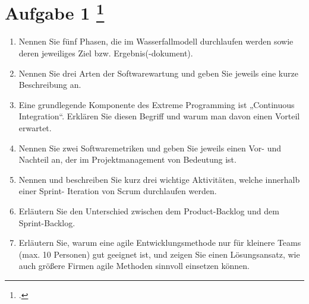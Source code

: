 \documentclass{lehramt-informatik-aufgabe}
\begin{document}
\liAufgabenTitel{}
\section{Aufgabe 1
\footcite{66116:2020:09}}

\begin{enumerate}

\item Nennen Sie fünf Phasen, die im Wasserfallmodell durchlaufen werden
sowie deren jeweiliges Ziel bzw. Ergebnis(-dokument).


\item Nennen Sie drei Arten der Softwarewartung und geben Sie jeweils
eine kurze Beschreibung an.


\item Eine grundlegende Komponente des Extreme Programming ist
„Continuous Integration“. Erklären Sie diesen Begriff und warum man
davon einen Vorteil erwartet.


\item Nennen Sie zwei Softwaremetriken und geben Sie jeweils einen Vor-
und Nachteil an, der im Projektmanagement von Bedeutung ist.


\item Nennen und beschreiben Sie kurz drei wichtige Aktivitäten, welche
innerhalb einer Sprint- Iteration von Scrum durchlaufen werden.


\item Erläutern Sie den Unterschied zwischen dem Product-Backlog und dem
Sprint-Backlog.


\item Erläutern Sie, warum eine agile Entwicklungsmethode nur für
kleinere Teams (max. 10 Personen) gut geeignet ist, und zeigen Sie einen
Lösungsansatz, wie auch größere Firmen agile Methoden sinnvoll einsetzen
können.

\end{enumerate}
\end{document}
